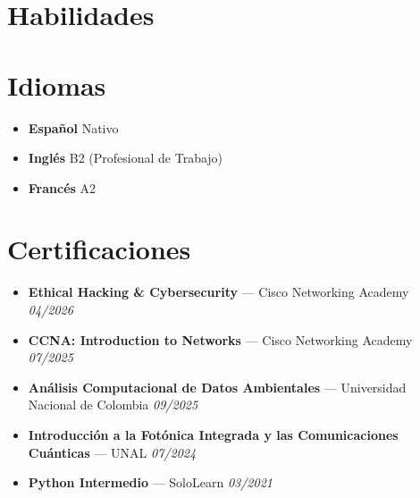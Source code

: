 \documentclass[11pt,a4paper]{article}
\begin{document}
\section{Habilidades}
\begin{tcolorbox}[colback=lightgray, colframe=lightgray, boxrule=0pt, arc=6pt, left=10pt, right=10pt, top=10pt, bottom=10pt]
\noindent
\linespread{1.8}\selectfont
{}
\end{tcolorbox}

\section{Idiomas}
\begin{itemize}[label={}, leftmargin=0.3cm, itemsep=6pt]
    \item \textbf{Español} \hfill Nativo \quad \textcolor{accent}{\faCircle \faCircle \faCircle \faCircle \faCircle}
    \item \textbf{Inglés} \hfill B2 (Profesional de Trabajo) \quad \textcolor{accent}{\faCircle \faCircle \faCircle \faCircle} \textcolor{bulletline}{\faCircle}
    \item \textbf{Francés} \hfill A2 \quad \textcolor{accent}{\faCircle \faCircle} \textcolor{bulletline}{\faCircle \faCircle \faCircle}
\end{itemize}

\section{Certificaciones}
\begin{itemize}[label={\color{accentblue}\faAward}, leftmargin=0.6cm, itemsep=6pt]
    \item \textbf{Ethical Hacking \& Cybersecurity} --- Cisco Networking Academy \hfill \textit{04/2026}
    \item \textbf{CCNA: Introduction to Networks} --- Cisco Networking Academy \hfill \textit{07/2025}
    \item \textbf{Análisis Computacional de Datos Ambientales} --- Universidad Nacional de Colombia \hfill \textit{09/2025}
    \item \textbf{Introducción a la Fotónica Integrada y las Comunicaciones Cuánticas} --- UNAL \hfill \textit{07/2024}
    \item \textbf{Python Intermedio} --- SoloLearn \hfill \textit{03/2021}
\end{itemize}
\end{document}
